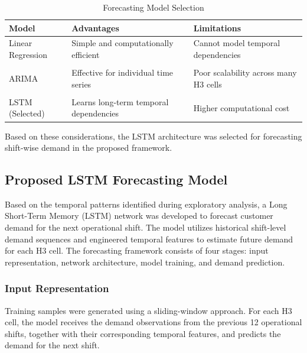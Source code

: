 \documentclass{article}
\begin{document}
\begin{table}[htbp]
\centering
\caption{Forecasting Model Selection}
\label{tab:forecasting_model_selection}
\begin{tabularx}{\textwidth}{>{\raggedright\arraybackslash}p{} >{\raggedright\arraybackslash}X >{\raggedright\arraybackslash}X}
\hline
\textbf{Model} & \textbf{Advantages} & \textbf{Limitations} \\
\hline
Linear Regression & Simple and computationally efficient & Cannot model temporal dependencies \\ \\
ARIMA & Effective for individual time series & Poor scalability across many H3 cells \\ \\
LSTM (Selected) & Learns long-term temporal dependencies & Higher computational cost \\
\hline
\end{tabularx}
\end{table}

Based on these considerations, the LSTM architecture was selected for forecasting shift-wise demand in the proposed framework.

\subsection{Proposed LSTM Forecasting Model}
\label{sec:proposed_lstm_forecasting_model}

Based on the temporal patterns identified during exploratory analysis, a Long Short-Term Memory (LSTM) network was developed to forecast customer demand for the next operational shift. The model utilizes historical shift-level demand sequences and engineered temporal features to estimate future demand for each H3 cell. The forecasting framework consists of four stages: input representation, network architecture, model training, and demand prediction.

\subsubsection{Input Representation}
\label{subsec:input_representation}

Training samples were generated using a sliding-window approach. For each H3 cell, the model receives the demand observations from the previous 12 operational shifts, together with their corresponding temporal features, and predicts the demand for the next shift.
\end{document}

